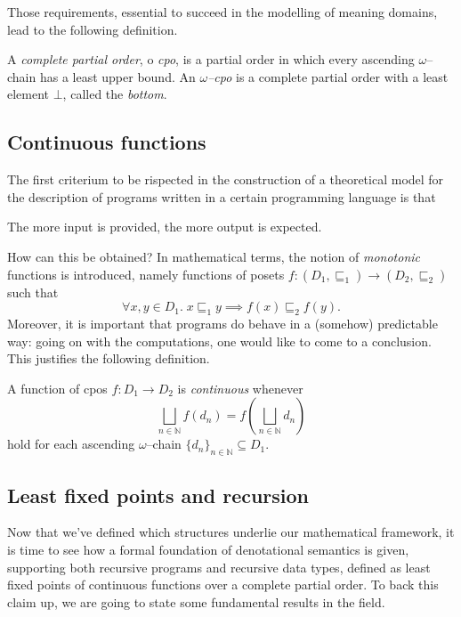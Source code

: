 Those requirements, essential to succeed in the modelling of meaning domains, lead to the following definition.

\begin{dfn}
  A \emph{complete partial order}, o \emph{cpo}, is a partial order in which every ascending \(\omega\)--chain has a least upper bound.
  An \emph{\(\omega\)--cpo} is a complete partial order with a least element
  \(\bot\), called the \emph{bottom}.
\end{dfn}

\subsection[Continuous functions]{Continuous functions}

The first criterium to be rispected in the construction of a theoretical model for the description of programs written in a certain programming language is that
\begin{displayquote}
  The more input is provided, the more output is expected.
\end{displayquote}
How can this be obtained? In mathematical terms, the notion of \emph{monotonic} functions is introduced, namely functions of posets%
\(f \colon (D_1,{}\sqsubseteq_1) \to (D_2,{}\sqsubseteq_2)\) such that
\begin{equation*}
  \forall{}x,y \in D_1.\; x \sqsubseteq_1 y \implies f(x) \sqsubseteq_2 f(y).
\end{equation*}
Moreover, it is important that programs do behave in a (somehow) predictable way: going on with the computations, one would like to come to a conclusion.
This justifies the following definition.

\begin{dfn}
  A function of cpos \(f \colon D_1 \to D_2\) is \emph{continuous} whenever
  \begin{equation*}
    \bigsqcup_{n \in \mathbb{N}} f(d_n) = f\left(\bigsqcup_{n\in\mathbb{N}}d_n\right)
  \end{equation*}
  hold for each ascending \(\omega\)--chain \(\lbrace d_n \rbrace_{n \in \mathbb{N}} \subseteq D_1\).
\end{dfn}

\subsection[Fixed points]{Least fixed points and recursion}

Now that we've defined which structures underlie our mathematical framework, it is time to see how a formal foundation of denotational semantics is given, supporting both recursive programs and recursive data types, defined as least
fixed points of continuous functions over a complete partial order.
To back this claim up, we are going to state some fundamental results in the field.

